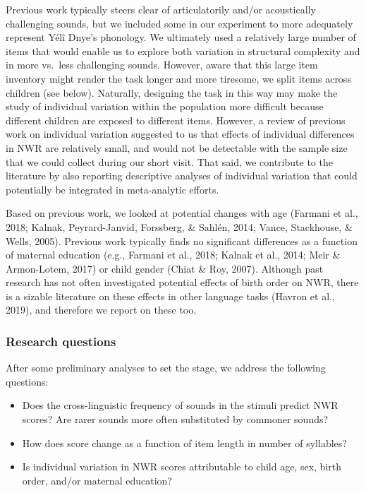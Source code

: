 \documentclass[english,,man,floatsintext]{apa6}
\providecommand{\tightlist}{%
  \setlength{\itemsep}{0pt}\setlength{\parskip}{0pt}}
\begin{document}
Previous work typically steers clear of articulatorily and/or
acoustically challenging sounds, but we included some in our experiment
to more adequately represent Yélî Dnye's phonology. We ultimately used a
relatively large number of items that would enable us to explore both
variation in structural complexity and in more vs.~less challenging
sounds. However, aware that this large item inventory might render the
task longer and more tiresome, we split items across children (see
below). Naturally, designing the task in this way may make the study of
individual variation within the population more difficult because
different children are exposed to different items. However, a review of
previous work on individual variation suggested to us that effects of
individual differences in NWR are relatively small, and would not be
detectable with the sample size that we could collect during our short
visit. That said, we contribute to the literature by also reporting
descriptive analyses of individual variation that could potentially be
integrated in meta-analytic efforts.

Based on previous work, we looked at potential changes with age (Farmani
et al., 2018; Kalnak, Peyrard-Janvid, Forssberg, \& Sahlén, 2014; Vance,
Stackhouse, \& Wells, 2005). Previous work typically finds no
significant differences as a function of maternal education (e.g.,
Farmani et al., 2018; Kalnak et al., 2014; Meir \& Armon-Lotem, 2017) or
child gender (Chiat \& Roy, 2007). Although past research has not often
investigated potential effects of birth order on NWR, there is a sizable
literature on these effects in other language tasks (Havron et al.,
2019), and therefore we report on these too.

\subsubsection{Research questions}\label{research-questions}

After some preliminary analyses to set the stage, we address the
following questions:

\begin{itemize}
\tightlist
\item
  Does the cross-linguistic frequency of sounds in the stimuli predict
  NWR scores? Are rarer sounds more often substituted by commoner
  sounds?
\item
  How does score change as a function of item length in number of
  syllables?
\item
  Is individual variation in NWR scores attributable to child age, sex,
  birth order, and/or maternal education?
\end{itemize}
\end{document}
